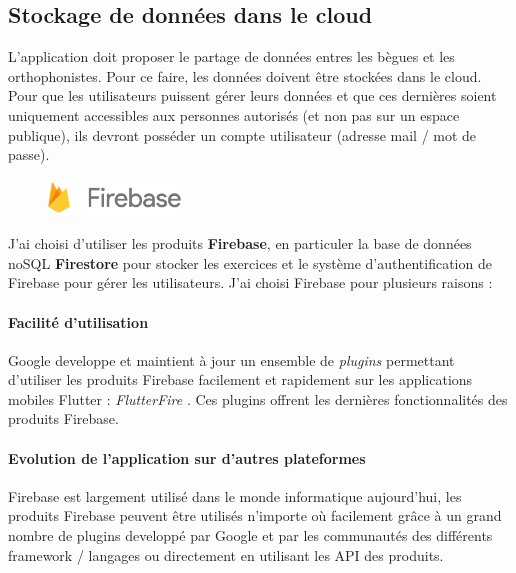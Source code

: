 \subsection{Stockage de données dans le cloud}

L'application doit proposer le partage de données entres les bègues et les orthophonistes. Pour ce faire, les données doivent être stockées dans le cloud. Pour que les utilisateurs puissent gérer leurs données et que ces dernières soient uniquement accessibles aux personnes autorisés (et non pas sur un espace publique), ils devront posséder un compte utilisateur (adresse mail / mot de passe).

\begin{figure}
  \includegraphics[width=100pt]{content/imgs/firebase.png}
\end{figure}
J'ai choisi d'utiliser les produits \textbf{Firebase}, en particuler la base de données noSQL \textbf{Firestore} pour stocker les exercices et le système d'authentification de Firebase pour gérer les utilisateurs. J'ai choisi Firebase pour plusieurs raisons :

\paragraph{Facilité d'utilisation}
Google developpe et maintient à jour un ensemble de \textit{plugins} permettant d'utiliser les produits Firebase facilement et rapidement sur les applications mobiles Flutter :  \textit{FlutterFire} \cite{flutterfire}. Ces plugins offrent les dernières fonctionnalités des produits Firebase.

\paragraph{Evolution de l'application sur d'autres plateformes}
Firebase est largement utilisé dans le monde informatique aujourd'hui, les produits Firebase peuvent être utilisés n'importe où facilement grâce à un grand nombre de plugins developpé par Google et par les communautés des différents framework / langages ou directement en utilisant les API des produits.

